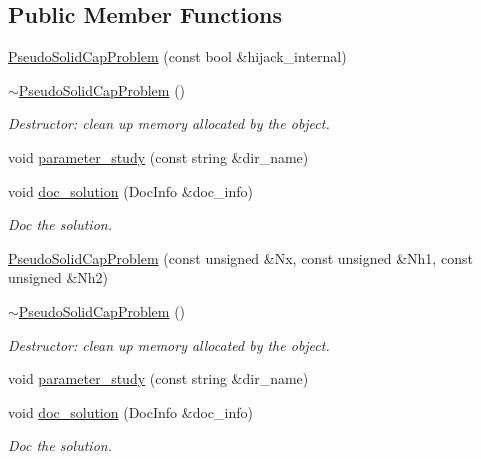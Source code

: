\subsection*{Public Member Functions}
\begin{DoxyCompactItemize}
\item 
\hyperlink{classPseudoSolidCapProblem_a4ac05a07dd55950bb67f7f79cb9fbb77}{Pseudo\+Solid\+Cap\+Problem} (const bool \&hijack\+\_\+internal)
\item 
\hyperlink{classPseudoSolidCapProblem_aec2a79e44dfd785b2978419210b053b8}{$\sim$\+Pseudo\+Solid\+Cap\+Problem} ()
\begin{DoxyCompactList}\small\item\em Destructor\+: clean up memory allocated by the object. \end{DoxyCompactList}\item 
void \hyperlink{classPseudoSolidCapProblem_ae86ecaf62fa0920f5d14bf82a7f83b0e}{parameter\+\_\+study} (const string \&dir\+\_\+name)
\item 
void \hyperlink{classPseudoSolidCapProblem_a2fb98a37bde5742cbdf3c91cb1f5eb2f}{doc\+\_\+solution} (Doc\+Info \&doc\+\_\+info)
\begin{DoxyCompactList}\small\item\em Doc the solution. \end{DoxyCompactList}\item 
\hyperlink{classPseudoSolidCapProblem_a4e8963d64b50a96902169838cc195903}{Pseudo\+Solid\+Cap\+Problem} (const unsigned \&Nx, const unsigned \&Nh1, const unsigned \&Nh2)
\item 
\hyperlink{classPseudoSolidCapProblem_aec2a79e44dfd785b2978419210b053b8}{$\sim$\+Pseudo\+Solid\+Cap\+Problem} ()
\begin{DoxyCompactList}\small\item\em Destructor\+: clean up memory allocated by the object. \end{DoxyCompactList}\item 
void \hyperlink{classPseudoSolidCapProblem_ae86ecaf62fa0920f5d14bf82a7f83b0e}{parameter\+\_\+study} (const string \&dir\+\_\+name)
\item 
void \hyperlink{classPseudoSolidCapProblem_a2fb98a37bde5742cbdf3c91cb1f5eb2f}{doc\+\_\+solution} (Doc\+Info \&doc\+\_\+info)
\begin{DoxyCompactList}\small\item\em Doc the solution. \end{DoxyCompactList}\end{DoxyCompactItemize}
